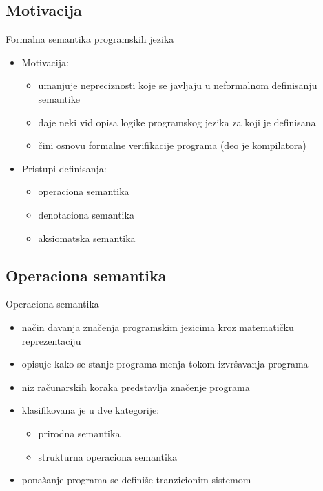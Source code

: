 \documentclass{beamer}
\begin{document}
\subsection{Motivacija}
\begin{frame}{Formalna semantika programskih jezika} 
 \begin{itemize}
 \item Motivacija:
 \begin{itemize}
 \item {\color{magenta} umanjuje nepreciznosti} koje se javljaju u neformalnom definisanju semantike
 \item daje neki vid {\color{magenta} opisa logike programskog jezika } za koji je definisana
 \item čini osnovu formalne verifikacije programa {\color{magenta} (deo je kompilatora)}
  \end{itemize}
 \item Pristupi definisanja:
 \begin{itemize}
 \item \color{blue}operaciona semantika
 \item denotaciona semantika
 \item aksiomatska semantika
 \end{itemize}
 \end{itemize}
\end{frame}



\subsection{Operaciona semantika}
\begin{frame}{Operaciona semantika}
 	\begin{itemize}
  		\item način davanja značenja programskim jezicima kroz matematičku reprezentaciju
		\item {\color{magenta}opisuje kako se stanje programa menja tokom izvršavanja programa}
		\item niz računarskih koraka predstavlja značenje programa
		\item klasifikovana je u dve kategorije: 
			\begin{itemize}
				\item {\color{blue} prirodna semantika}
				\item {\color{blue} strukturna operaciona semantika}
			\end{itemize}
		\item ponašanje programa se definiše tranzicionim sistemom
 	\end{itemize}
\end{frame}
\end{document}
